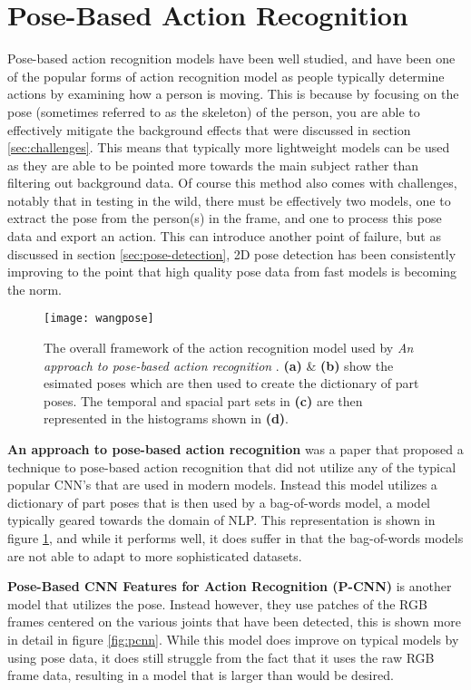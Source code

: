 \section{Pose-Based Action Recognition}
\label{sec:pose-based}

Pose-based action recognition models have been well studied, and have been one of the popular forms of action recognition model as people typically determine actions by examining how a person is moving. This is because by focusing on the pose (sometimes referred to as the skeleton) of the person, you are able to effectively mitigate the background effects that were discussed in section \ref{sec:challenges}. This means that typically more lightweight models can be used as they are able to be pointed more towards the main subject rather than filtering out background data. Of course this method also comes with challenges, notably that in testing in the wild, there must be effectively two models, one to extract the pose from the person(s) in the frame, and one to process this pose data and export an action. This can introduce another point of failure, but as discussed in section \ref{sec:pose-detection}, 2D pose detection has been consistently improving to the point that high quality pose data from fast models is becoming the norm.

\begin{figure}[ht]
	\texttt{[image: wangpose]}
	\centering
	\caption{The overall framework of the action recognition model used by \textit{An approach to pose-based action recognition} \cite{WangPose}. \textbf{(a)} \& \textbf{(b)} show the esimated poses which are then used to create the dictionary of part poses. The temporal and spacial part sets in \textbf{(c)} are then represented in the histograms shown in \textbf{(d)}.}
	\label{fig:wangpose}
\end{figure}

\textbf{An approach to pose-based action recognition} \cite{WangPose} was a paper that proposed a technique to pose-based action recognition that did not utilize any of the typical popular CNN's that are used in modern models. Instead this model utilizes a dictionary of part poses that is then used by a bag-of-words model, a model typically geared towards the domain of NLP. This representation is shown in figure \ref{fig:wangpose}, and  while it performs well, it does suffer in that the bag-of-words models are not able to adapt to more sophisticated datasets.

\textbf{Pose-Based CNN Features for Action Recognition (P-CNN)} \cite{PCNN} is another model that utilizes the pose. Instead however, they use patches of the RGB frames centered on the various joints that have been detected, this is shown more in detail in figure \ref{fig:pcnn}. While this model does improve on typical models by using pose data, it does still struggle from the fact that it uses the raw RGB frame data, resulting in a model that is larger than would be desired.

